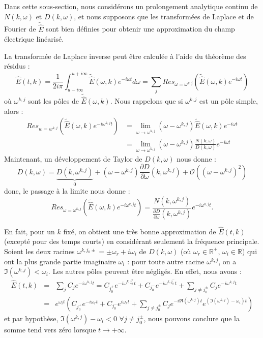 Dans cette sous-section, nous considérons un prolongement analytique continu de $N(k,\omega)$ et $D(k,\omega)$, et nous supposons que les transformées de Laplace et de Fourier de $\tilde{\hat{E}}$ sont bien définies pour obtenir une approximation du champ électrique linéarisé.

La transformée de Laplace inverse peut être calculée à l'aide du théorème des résidus :
$$
  \hat{E}(t,k)=\frac{1}{2i\pi}\int_{u-i\infty}^{u+i\infty}\tilde{\hat{E}}(\omega,k)e^{-i\omega t}d\omega=\sum_jRes_{\omega=\omega^{k,j}}\left(\tilde{\hat{E}}(\omega,k)e^{-i\omega t}\right)
$$
où $\omega^{k,j}$ sont les pôles de $\tilde{\hat{E}}(\omega,k)$. Nous rappelons que si $\omega^{k,j}$ est un pôle simple, alors :
$$
  \begin{aligned}
    Res_{w=w^{k,j}}\left( \tilde{\hat{E}}(\omega,k)e^{-i\omega^{k,j}t} \right)
      & = \lim_{\omega\to\omega^{k,j}}\left( \omega - \omega^{k,j} \right)\tilde{\hat{E}}(\omega,k)e^{-i\omega t} \\
      & = \lim_{\omega\to\omega^{k,j}}\left( \omega - \omega^{k,j} \right)\frac{N(k,\omega)}{D(k,\omega)}e^{-i\omega t}
  \end{aligned}
$$
Maintenant, un développement de Taylor de $D(k,\omega)$ nous donne :
$$
  D(k,\omega) = \underbrace{D(k,\omega^{k,j})}_{0} + \left( \omega - \omega^{k,j} \right)\frac{\partial D}{\partial \omega}(k,\omega^{k,j}) + \mathcal{O}\left( (\omega-\omega^{k,j})^2 \right)
$$
donc, le passage à la limite nous donne :
\begin{equation}
  Res_{\omega=\omega^{k,j}}\left(\tilde{\hat{E}}(\omega,k)e^{-i\omega^{k,j}t}\right)=\frac{N(k,\omega^{k,j})}{\frac{\partial D}{\partial \omega}(k,\omega^{k,j})}e^{-i\omega^{k,j} t}.
  \label{eq:residu}
\end{equation}

\begin{remark}
  En fait, pour un $k$ fixé, on obtient une très bonne approximation de $\hat{E}(t,k)$ (excepté pour des temps courts) en considérant seulement la fréquence principale. Soient les deux racines $\omega^{k,j_0\pm}=\pm\omega_r+i\omega_i$ de $D(k,\omega)$ (où $\omega_r\in\mathbb{R}^+$, $\omega_i\in\mathbb{R}$) qui ont la plus grande partie imaginaire $\omega_i$ : pour toute autre racine $\omega^{k,j}$, on a $\Im(\omega^{k,j})<\omega_i$. Les autres pôles peuvent être négligés. En effet, nous avons :
  $$
    \begin{aligned}
       \hat{E}(t,k)&=&\sum_jC_je^{-i\omega^{k,j} t}=C_{j_0^+}e^{-i\omega^{k,j_0^+}t}+C_{j_0^-}e^{-i\omega^{k,j_0^-}t}+\sum_{j\neq j_0^\pm}C_je^{-i\omega^{k,j} t}\\
 &=&e^{\omega_it}\left(C_{j_0^+}e^{-i\omega_rt}+C_{j_0^-}e^{i\omega_rt}+\sum_{j\neq j_0^\pm}C_je^{-i\Re(\omega^{k,j}) t}e^{(\Im(\omega^{k,j})-\omega_i)t}\right)
    \end{aligned}
  $$
  et par hypothèse, $\Im(\omega^{k,j})-\omega_i < 0$ $\forall j\neq j_0^\pm$, nous pouvons conclure que la somme tend vers zéro lorsque $t\to+\infty$.
\end{remark}

